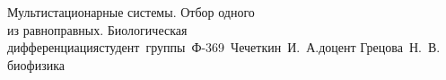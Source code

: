 



\usepackage{color}
\usepackage[colorlinks,linkcolor=black,filecolor=blue,citecolor=darkgreen]{hyperref}

\renewcommand{\labelitemi}{\normalfont\bfseries{--}}
\newcommand{\st}[1]{\bar{#1}}
\newcommand{\ds}{\displaystyle}


{Мультистационарные системы. Отбор одного\\из равноправных. Биологическая
дифференциация}{студент~группы~Ф-369~Чечеткин~И.~А.}{доцент Грецова~Н.~В.}
{биофизика}
        
    \tableofcontents
    \thispagestyle{empty}
    \newpage
    
